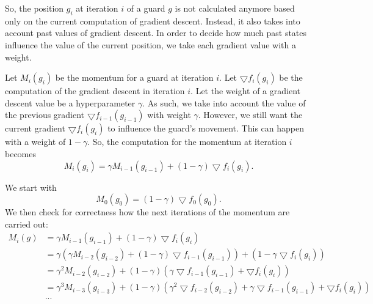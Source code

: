 So, the position $g_i$ at iteration $i$ of a guard $g$ is not calculated anymore based only on the current computation of gradient descent. Instead, it also takes into account past values of gradient descent. In order to decide how much past states influence the value of the current position, we  take each gradient value with a weight.

Let $M_i(g_i)$ be the momentum for a guard at iteration $i$. Let $\bigtriangledown f_i(g_i)$ be the computation of the gradient descent in iteration $i$. Let the weight of a gradient descent value be a hyperparameter $\gamma$. 
As such, we  take into account the value of the previous gradient $\bigtriangledown f_{i - 1}(g_{i - 1})$ with weight $\gamma$. However, we still want the current gradient $\bigtriangledown f_i(g_i)$ to influence the guard's movement. This can happen with a weight of $1 - \gamma$. So, the computation for the momentum at iteration $i$ becomes $$M_i(g_i) = \gamma M_{i - 1}(g_{i - 1}) + (1 - \gamma)\bigtriangledown f_i(g_i).$$

We start with $$M_0(g_0) = (1 - \gamma) \bigtriangledown f_0(g_0).$$
We  then check for correctness how  the next iterations of the momentum are carried out:
\begin{align*}
    M_i(g) &= \gamma M_{i - 1}(g_{i - 1}) + (1 - \gamma) \bigtriangledown f_i(g_i) \\
        &= \gamma (\gamma M_{i - 2}(g_{i - 2}) + (1 - \gamma) \bigtriangledown f_{i - 1}(g_{i - 1})) + (1 - \gamma \bigtriangledown f_i(g_i)) \\ 
        &= \gamma^2 M_{i - 2}(g_{i - 2}) + (1 - \gamma)(\gamma \bigtriangledown f_{i - 1}(g_{i - 1}) + \bigtriangledown f_i(g_i)) \\
        &= \gamma^3 M_{i - 3}(g_{i - 3}) + (1 - \gamma)(\gamma^2 \bigtriangledown f_{i - 2}(g_{i - 2}) + \gamma \bigtriangledown f_{i - 1}(g_{i - 1}) + \bigtriangledown f_i(g_i)) \\
        &...
\end{align*}

